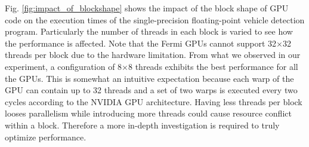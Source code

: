 Fig. \ref{fig:impact_of_blockshape} shows the impact of the block shape
of GPU code on the execution times of the single-precision
floating-point vehicle detection program.
Particularly the number of threads in each block is varied to see how
the performance is affected.
Note that the Fermi GPUs cannot support 32$\times$32 threads per block
due to the hardware limitation.
From what we observed in our experiment, a configuration of 8$\times$8
threads exhibits the best performance for all the GPUs.
This is somewhat an intuitive expectation because each warp of the GPU
can contain up to 32 threads and a set of two warps is executed every
two cycles according to the NVIDIA GPU architecture.
Having less threads per block looses parallelism while introducing more
threads could cause resource conflict within a block.
Therefore a more in-depth investigation is required to truly optimize
performance.
